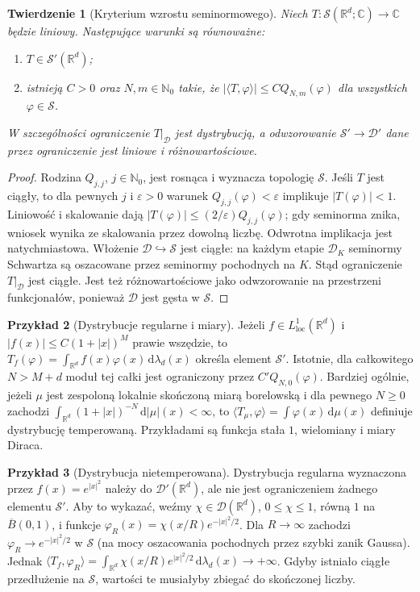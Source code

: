 \documentclass[11pt,a4paper]{article}
\numberwithin{equation}{section}
\theoremstyle{plain}
\newtheorem{twierdzenie}{Twierdzenie}[section]
\theoremstyle{definition}
\newtheorem{przyklad}[twierdzenie]{Przykład}
\theoremstyle{remark}
\newcommand{\R}{\mathbb R}
\newcommand{\C}{\mathbb C}
\newcommand{\N}{\mathbb N}
\begin{document}
\begin{twierdzenie}[Kryterium wzrostu seminormowego]
\label{thm:tempered-estimate22}
Niech $T:\mathcal S(\R^d;\C)\to\C$ będzie liniowy.
Następujące warunki są równoważne:
\begin{enumerate}
\item $T\in\mathcal S'(\R^d)$;
\item istnieją $C>0$ oraz $N,m\in\N_0$ takie, że
$|\langle T,\varphi\rangle|\le C Q_{N,m}(\varphi)$
dla wszystkich $\varphi\in\mathcal S$.
\end{enumerate}
W szczególności ograniczenie $T|_{\mathcal D}$ jest dystrybucją,
a odwzorowanie $\mathcal S'\to\mathcal D'$ dane przez
ograniczenie jest liniowe i różnowartościowe.
\end{twierdzenie}
\begin{proof}
Rodzina $Q_{j,j}$, $j\in\N_0$, jest rosnąca
i wyznacza topologię $\mathcal S$. Jeśli $T$ jest ciągły,
to dla pewnych $j$ i $\varepsilon>0$ warunek
$Q_{j,j}(\varphi)<\varepsilon$ implikuje
$|T(\varphi)|<1$. Liniowość i skalowanie dają
$|T(\varphi)|\le (2/\varepsilon)Q_{j,j}(\varphi)$;
gdy seminorma znika, wniosek wynika ze skalowania przez
dowolną liczbę. Odwrotna implikacja jest natychmiastowa.
Włożenie $\mathcal D\hookrightarrow\mathcal S$ jest ciągłe:
na każdym etapie $\mathcal D_K$ seminormy Schwartza
są oszacowane przez seminormy pochodnych na $K$.
Stąd ograniczenie $T|_{\mathcal D}$ jest ciągłe.
Jest też różnowartościowe jako odwzorowanie na przestrzeni
funkcjonałów, ponieważ $\mathcal D$ jest gęsta w $\mathcal S$.
\end{proof}

\begin{przyklad}[Dystrybucje regularne i miary]
\label{ex:tempered-regular22}
Jeżeli $f\in L^1_{\mathrm{loc}}(\R^d)$ i
$|f(x)|\le C(1+|x|)^M$ prawie wszędzie,
to $T_f(\varphi)=\int_{\R^d}f(x)\varphi(x)\,\mathrm d\lambda_d(x)$
określa element $\mathcal S'$. Istotnie, dla całkowitego
$N>M+d$ moduł tej całki jest ograniczony przez
$C'Q_{N,0}(\varphi)$.
Bardziej ogólnie, jeżeli $\mu$ jest zespoloną lokalnie skończoną
miarą borelowską i dla pewnego $N\ge0$ zachodzi
$\int_{\R^d}(1+|x|)^{-N}\,\mathrm d|\mu|(x)<\infty$,
to $\langle T_\mu,\varphi\rangle=\int\varphi(x)\,\mathrm d\mu(x)$
definiuje dystrybucję temperowaną.
Przykładami są funkcja stała $1$, wielomiany i miary Diraca.
\end{przyklad}

\begin{przyklad}[Dystrybucja nietemperowana]
\label{ex:non-tempered22}
Dystrybucja regularna wyznaczona przez
$f(x)=e^{|x|^2}$ należy do $\mathcal D'(\R^d)$,
ale nie jest ograniczeniem żadnego elementu $\mathcal S'$.
Aby to wykazać, weźmy $\chi\in\mathcal D(\R^d)$,
$0\le\chi\le1$, równą $1$ na $\overline B(0,1)$,
i funkcje $\varphi_R(x)=\chi(x/R)e^{-|x|^2/2}$.
Dla $R\to\infty$ zachodzi
$\varphi_R\to e^{-|x|^2/2}$ w $\mathcal S$
(na mocy oszacowania pochodnych przez szybki zanik Gaussa).
Jednak
$\langle T_f,\varphi_R\rangle
=\int_{\R^d}\chi(x/R)e^{|x|^2/2}\,\mathrm d\lambda_d(x)
\to+\infty$.
Gdyby istniało ciągłe przedłużenie na $\mathcal S$,
wartości te musiałyby zbiegać do skończonej liczby.
\end{przyklad}
\end{document}
